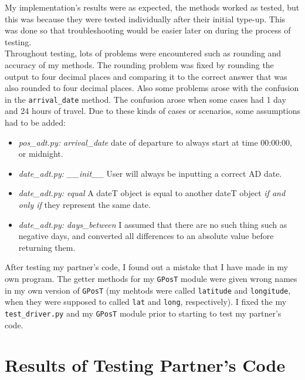 \documentclass[12pt]{article}
\begin{document}
        My implementation's results were as expected, the methods worked as tested, but this was because they were tested individually after their initial type-up. This was done so that troubleshooting would be easier later on during the process of testing.\\

        Throughout testing, lots of problems were encountered such as rounding and accuracy of my methods. The rounding problem was fixed by rounding the output to four decimal places and comparing it to the correct answer that was also rounded to four decimal places. Also some problems arose with the confusion in the \verb|arrival_date| method. The confusion arose when some cases had 1 day and 24 hours of travel. Due to these kinds of cases or scenarios, some assumptions had to be added:\\

\begin{itemize}

	\item \textit{pos\_adt.py: arrival\_date} \textemdash  date of departure to always start at time 00:00:00, or midnight.

	\item \textit{date\_adt.py: \_\_init\_\_} \textemdash  User will always be inputting a correct AD date.

	\item \textit{date\_adt.py: equal} \textemdash A dateT object is equal to another dateT object \textit{if and only if} they represent the same date.

	\item \textit{date\_adt.py: days\_between} \textemdash I assumed that there are no such thing such as negative days, and converted all differences to an absolute value before returning them.

\end{itemize}

        After testing my partner's code, I found out a mistake that I have made in my own program. The getter methods for my \verb|GPosT| module were given wrong names in my own version of \verb|GPosT| (my mehtods were called \verb|latitude| and \verb|longitude|, when they were supposed to called \verb|lat| and \verb|long|, respectively). I fixed the my \verb|test_driver.py| and my \verb|GPosT| module prior to starting to test my partner's code.

\section{Results of Testing Partner's Code}
\end{document}
